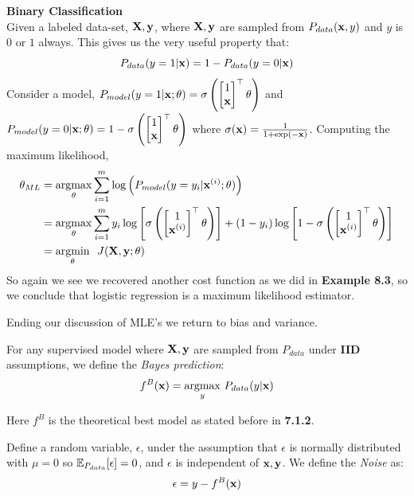 \begin{example}
    \textbf{Binary Classification}\\
     \indent Given a labeled data-set, $\MX, \vy$, where $\MX, \vy$ are sampled from $P_{data}(\vx,y)$ and $y$ is $0$ or $1$ always. This gives us the very useful property that: 
    $$P_{data}(y=1|\vx) = 1-P_{data}(y=0|\vx)$$
    Consider a model, $P_{model}(y=1|\vx;\vtheta) = \sigma\left( \begin{bmatrix}1 \\ \vx \end{bmatrix}^\top \vtheta\right)$ and $P_{model}(y=0|\vx;\vtheta) = 1-\sigma\left( \begin{bmatrix}1 \\ \vx \end{bmatrix}^\top \vtheta\right)$  where $\sigma(\vx) = \frac{1}{1+\exp(-\vx)}$.
    Computing the maximum likelihood, 
    \begin{align*}
        \vtheta_{ML} &= \underset{\vtheta}{\argmax}\sum_{i=1}^m\log\left(P_{model}(y = y_i|\vx^{(i)};\vtheta) \right)\\
        &=\underset{\vtheta}{\argmax}\sum_{i=1}^my_i\log\left[\sigma\left( \begin{bmatrix}1 \\ \vx^{(i)} \end{bmatrix}^\top \vtheta\right) \right]+(1-y_i)\log\left[1-\sigma\left( \begin{bmatrix}1 \\ \vx^{(i)} \end{bmatrix}^\top \vtheta\right) \right] \\
        &= \underset{\vtheta}{\argmin} \ \ J(\MX, \vy; \theta)
    \end{align*}
    So again we see we recovered another cost function as we did in \textbf{Example 8.3}, so we conclude that logistic regression is a maximum likelihood estimator. 
\end{example}
Ending our discussion of MLE's we return to bias and variance. 
\begin{definition}
    For any supervised model where $\MX, \vy$ are sampled from $P_{data}$ under \textbf{IID} assumptions, we define the \textit{Bayes prediction}: 
    $$f^B(\vx) = \underset{y}{\argmax}\ P_{data}(y|\vx)$$
\end{definition}
Here $f^B$ is the theoretical best model as stated before in \textbf{7.1.2}. 
\begin{definition}
    Define a random variable, $\epsilon$, under the assumption that $\epsilon$ is normally distributed with $\mu=0$ so $\Ev_{P_{data}}[\epsilon] = 0$, and $\epsilon$ is independent of $\vx,\vy$. We define the \textit{Noise} as:
    $$\epsilon = y - f^B(\vx)$$
\end{definition}
